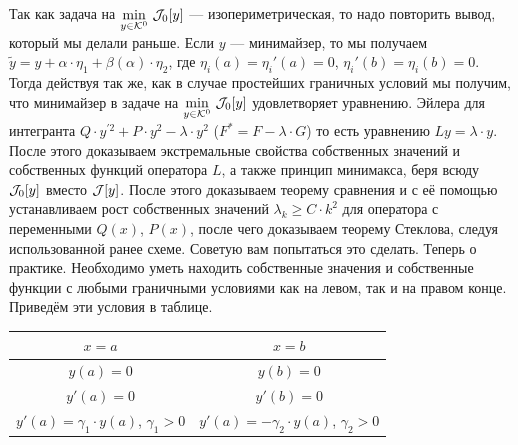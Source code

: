 Так как задача на $\displaystyle\min\limits_{y\in\mathcal{K}^0}\,\mathcal{J}_0[y]$ --- изопериметрическая, то надо повторить вывод, который мы делали раньше. Если $y$ --- минимайзер, то мы получаем $\tilde{y}=y+\alpha\cdot\eta_1+\beta(\alpha)\cdot\eta_2$, где $\eta_i(a)=\eta_i'(a)=0$, $\eta_i'(b)=\eta_i(b)=0$. Тогда действуя так же, как в случае простейших граничных условий мы получим, что минимайзер в задаче на $\displaystyle\min\limits_{y\in\mathcal{K}^0}\,\mathcal{J}_0[y]$ удовлетворяет уравнению. Эйлера для интегранта $Q\cdot y^{\prime2}+P\cdot y^2-\lambda\cdot y^2$ ($F^{\ast}=F-\lambda\cdot G$) то есть уравнению $Ly=\lambda\cdot y$. После этого доказываем экстремальные свойства собственных значений и собственных функций оператора $L$, а также принцип минимакса, беря всюду $\mathcal{J}_0[y]$ вместо $\mathcal{J}[y]$. После этого доказываем теорему сравнения и с её помощью устанавливаем рост собственных значений $\lambda_k\geqslant C\cdot k^2$ для оператора с переменными $Q(x)$, $P(x)$, после чего доказываем теорему Стеклова, следуя использованной ранее схеме. Советую вам попытаться это сделать. Теперь о практике. Необходимо уметь находить собственные значения и собственные функции с любыми граничными условиями как на левом, так и на правом конце. Приведём эти условия в таблице.
\begin{center}
	\begin{tabular}{|c|c|}
		\hline
		$x=a$ & $x=b$ \\
		\hline
		$y(a)=0$ & $y(b)=0$ \\
		\hline
		$y'(a)=0$ & $y'(b)=0$ \\
		\hline
		$y'(a)=\gamma_1\cdot y(a)$, $\gamma_1>0$ & $y'(a)=-\gamma_2\cdot y(a)$, $\gamma_2>0$ \\
		\hline
	\end{tabular} 
\end{center}
